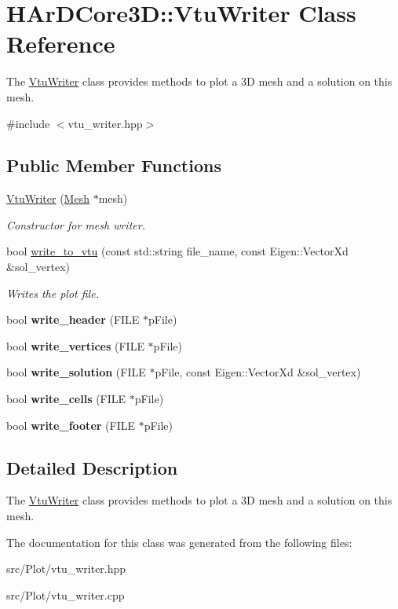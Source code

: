 \hypertarget{classHArDCore3D_1_1VtuWriter}{}\section{H\+Ar\+D\+Core3D\+:\+:Vtu\+Writer Class Reference}
\label{classHArDCore3D_1_1VtuWriter}


The \hyperlink{classHArDCore3D_1_1VtuWriter}{Vtu\+Writer} class provides methods to plot a 3D mesh and a solution on this mesh.  




{\ttfamily \#include $<$vtu\+\_\+writer.\+hpp$>$}

\subsection*{Public Member Functions}
\begin{DoxyCompactItemize}
\item 
\hyperlink{group__Plot_ga7aff33c21507345fcaa46515ed006470}{Vtu\+Writer} (\hyperlink{classHArDCore3D_1_1Mesh}{Mesh} $\ast$mesh)
\begin{DoxyCompactList}\small\item\em Constructor for mesh writer. \end{DoxyCompactList}\item 
bool \hyperlink{group__Plot_ga11ec3bf54886e6570bfe72daf3f41a5d}{write\+\_\+to\+\_\+vtu} (const std\+::string file\+\_\+name, const Eigen\+::\+Vector\+Xd \&sol\+\_\+vertex)
\begin{DoxyCompactList}\small\item\em Writes the plot file. \end{DoxyCompactList}\item 
bool {\bfseries write\+\_\+header} (F\+I\+LE $\ast$p\+File)
\item 
bool {\bfseries write\+\_\+vertices} (F\+I\+LE $\ast$p\+File)
\item 
bool {\bfseries write\+\_\+solution} (F\+I\+LE $\ast$p\+File, const Eigen\+::\+Vector\+Xd \&sol\+\_\+vertex)
\item 
bool {\bfseries write\+\_\+cells} (F\+I\+LE $\ast$p\+File)
\item 
bool {\bfseries write\+\_\+footer} (F\+I\+LE $\ast$p\+File)
\end{DoxyCompactItemize}


\subsection{Detailed Description}
The \hyperlink{classHArDCore3D_1_1VtuWriter}{Vtu\+Writer} class provides methods to plot a 3D mesh and a solution on this mesh. 

The documentation for this class was generated from the following files\+:\begin{DoxyCompactItemize}
\item 
src/\+Plot/vtu\+\_\+writer.\+hpp\item 
src/\+Plot/vtu\+\_\+writer.\+cpp\end{DoxyCompactItemize}
